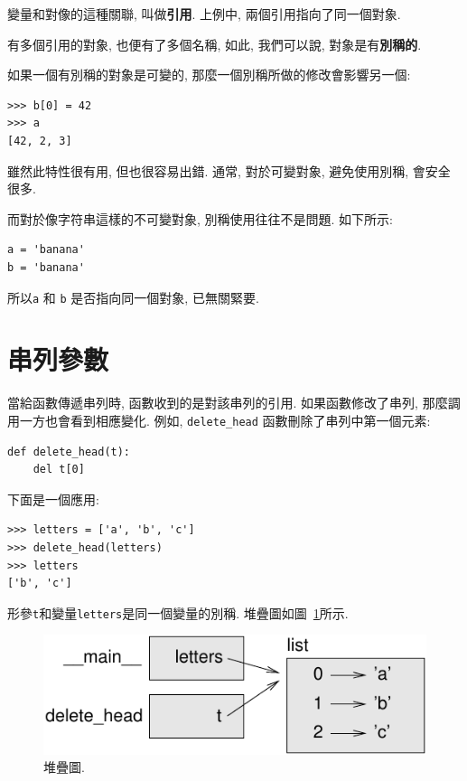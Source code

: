 \documentclass[10pt]{book}
\begin{document}
變量和對像的這種關聯, 叫做{\bf 引用}.
上例中, 兩個引用指向了同一個對象. 

有多個引用的對象, 也便有了多個名稱, 
如此, 我們可以說, 對象是有{\bf 別稱的}.

如果一個有別稱的對象是可變的, 那麼一個別稱所做的修改會影響另一個:

\begin{verbatim}
>>> b[0] = 42
>>> a
[42, 2, 3]
\end{verbatim}
%

雖然此特性很有用, 但也很容易出錯. 
通常, 對於可變對象, 避免使用別稱, 會安全很多. 

而對於像字符串這樣的不可變對象, 別稱使用往往不是問題. 
如下所示:

\begin{verbatim}
a = 'banana'
b = 'banana'
\end{verbatim}
%
所以{\tt a} 和 {\tt b} 是否指向同一個對象, 已無關緊要. 


\section{串列參數}
\label{list.arguments}

當給函數傳遞串列時, 函數收到的是對該串列的引用. 
如果函數修改了串列, 那麼調用一方也會看到相應變化. 
例如, \verb"delete_head" 函數刪除了串列中第一個元素:

\begin{verbatim}
def delete_head(t):
    del t[0]
\end{verbatim}
%

下面是一個應用:

\begin{verbatim}
>>> letters = ['a', 'b', 'c']
>>> delete_head(letters)
>>> letters
['b', 'c']
\end{verbatim}
%
形參{\tt t}和變量{\tt letters}是同一個變量的別稱. 
堆疊圖如圖~\ref{fig.stack5}所示.

\begin{figure}
\centerline
{\includegraphics[scale=0.8]{figs/stack5.pdf}}
\caption{堆疊圖.}
\label{fig.stack5}
\end{figure}
\end{document}
